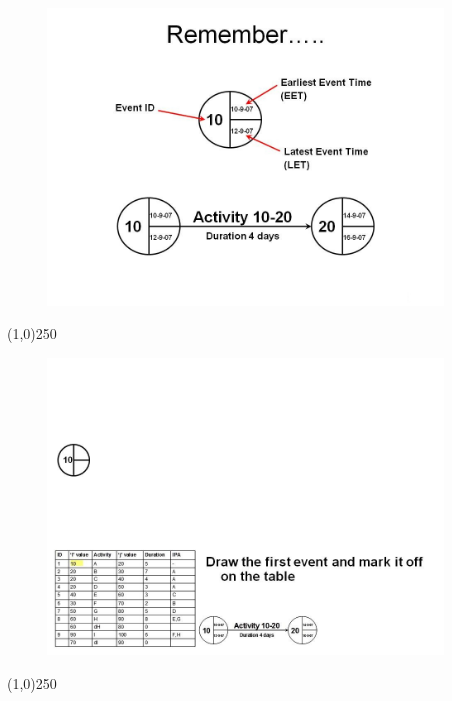 \begin{frame}
\begin{figure}
	\centering
		\includegraphics[width = 10.5cm]{oldnotes/Slide80.jpg}
\end{figure}
\end{frame}
\begin{center}\line(1,0){250}\end{center}


\begin{frame}
\begin{figure}
	\centering
		\includegraphics[width = 10.5cm]{oldnotes/Slide81.jpg}
\end{figure}
\end{frame}
\begin{center}\line(1,0){250}\end{center}


